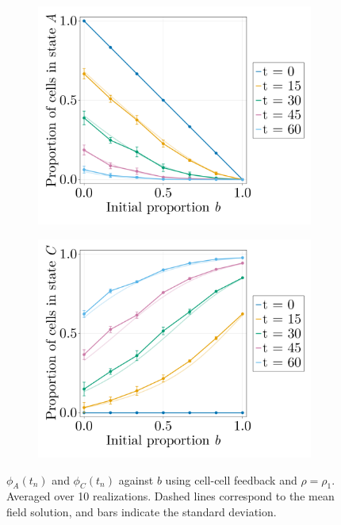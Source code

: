 \begin{figure}
    \centering
    \begin{subfigure}{0.47\textwidth}
        \centering
        \includegraphics[width=\textwidth]{figures/408/408-phib-vs-b-simulation-10ite-fp10-cellcell-vs-meanfield-a.png}
    \end{subfigure}
    \hfill
    \begin{subfigure}{0.47\textwidth}
        \centering
        \includegraphics[width=\textwidth]{figures/408/408-phib-vs-b-simulation-10ite-fp10-cellcell-vs-meanfield-c.png}
    \end{subfigure}
    \caption{$\phi_A(t_n)$ and $\phi_C(t_n)$ against $b$ using cell-cell feedback and $\rho=\rho_1$. Averaged over 10 realizations. Dashed lines correspond to the mean field solution, and bars indicate the standard deviation.}
    \label{fig:phix-simulations}
\end{figure}



